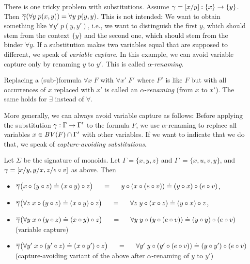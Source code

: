There is one tricky problem with substitutions. Assume $\gamma=[x/y]:\{x\}\rightarrow\{y\}$. Then $\overline{\gamma}(\forall y\;p(x,y))=\forall y\;p(y,y)$. This is not intended: We want to obtain something like $\forall y'\;p(y,y')$, i.e., we want to distinguish the first $y$, which should stem from the context $\{y\}$ and the second one, which should stem from the binder $\forall y$. If a substitution makes two variables equal that are supposed to different, we speak of \emph{variable capture}. In this example, we can avoid variable capture only by renaming $y$ to $y'$. This is called $\alpha$-\emph{renaming}.

\begin{definition}
Replacing a (sub-)formula $\forall x\;F$ with $\forall x'\;F'$ where $F'$ is like $F$ but with all occurrences of $x$ replaced with $x'$ is called an $\alpha$-\emph{renaming} (from $x$ to $x'$). The same holds for $\exists$ instead of $\forall$.
\end{definition}

More generally, we can always avoid variable capture as follows: Before applying the substitution $\gamma:\Gamma\rightarrow\Gamma'$ to the formula $F$, we use $\alpha$-renaming to replace all variables $x\in\mathit{BV}(F)\cap\Gamma'$ with other variables. If we want to indicate that we do that, we speak of \emph{capture-avoiding substitutions}.

\begin{example}\label{ex:fol:subapp}
Let $\Sigma$ be the signature of monoids. Let $\Gamma=\{x,y,z\}$ and $\Gamma'=\{x,u,v,y\}$, and $\gamma=[x/y,y/x,z/e\circ v]$ as above. Then
\begin{itemize}
\item $\overline{\gamma}\big(x\circ (y\circ z) \doteq (x\circ y)\circ z\big) \hspace*{.5cm}=\hspace*{.5cm} y\circ (x\circ (e\circ v)) \doteq (y\circ x)\circ (e\circ v)$,
\item $\overline{\gamma}\big(\forall z \; x\circ (y\circ z) \doteq (x\circ y)\circ z\big) \hspace*{.5cm}=\hspace*{.5cm} \forall z \; y\circ (x\circ z) \doteq (y\circ x)\circ z$,
\item $\overline{\gamma}\big(\forall y \; x\circ (y\circ z) \doteq (x\circ y)\circ z\big) \hspace*{.5cm}=\hspace*{.5cm}
                       \forall y \; y\circ (y\circ (e\circ v)) \doteq (y\circ y)\circ (e\circ v)$ 
                       \\ (variable capture)
\item $\overline{\gamma}\big(\forall y' \; x\circ (y'\circ z) \doteq (x\circ y')\circ z\big) \hspace*{.5cm}=\hspace*{.5cm}
                       \forall y' \; y\circ (y'\circ (e\circ v)) \doteq (y\circ y')\circ (e\circ v)$
                       \\ (capture-avoiding variant of the above after $\alpha$-renaming of $y$ to $y'$)
\end{itemize}
\end{example}

